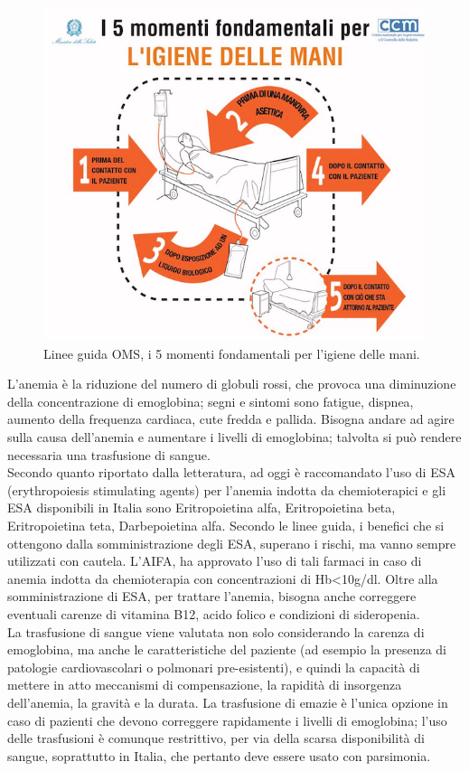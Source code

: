 \begin{figure}[H]
    \begin{center}
    \includegraphics[width=0.5\columnwidth]{img/5MOMENTI.png}
    \vspace{-3mm}
    \end{center}
    \caption{Linee guida OMS, i 5 momenti fondamentali per l'igiene delle mani.
    \cite{MANIOMS}}
    
\end{figure}

L’anemia è la riduzione del numero di globuli rossi, che provoca una diminuzione della concentrazione di emoglobina; 
segni e sintomi sono fatigue, dispnea, aumento della frequenza cardiaca, cute fredda e pallida\cite{LLSLOWCELLS}.
Bisogna andare ad agire sulla causa dell’anemia e aumentare i livelli di emoglobina; talvolta si può rendere necessaria 
una trasfusione di sangue\cite{AMERICANLOWCELLS}.\\
Secondo quanto riportato dalla letteratura, ad oggi è raccomandato l’uso di ESA (erythropoiesis stimulating agents) 
per l’anemia indotta da chemioterapici e gli ESA disponibili in Italia sono Eritropoietina alfa, Eritropoietina beta, 
Eritropoietina teta, Darbepoietina alfa. Secondo le linee guida, i benefici che si ottengono dalla somministrazione 
degli ESA, superano i rischi, ma vanno sempre utilizzati con cautela. L’AIFA, ha approvato l’uso di tali farmaci 
in caso di anemia indotta da chemioterapia con concentrazioni di Hb<10g/dl\cite{AIOMTOSS}.
Oltre alla somministrazione di ESA, per trattare l’anemia, bisogna anche correggere eventuali carenze di vitamina B12, 
acido folico e condizioni di sideropenia.\\ 
La trasfusione di sangue viene valutata non solo considerando la carenza di emoglobina, ma anche le caratteristiche 
del paziente (ad esempio la presenza di patologie cardiovascolari o polmonari pre-esistenti), 
e quindi la capacità di mettere in atto meccanismi di compensazione, la rapidità di 
insorgenza dell’anemia, la gravità e la durata. La trasfusione di emazie è l’unica opzione in caso di pazienti 
che devono correggere rapidamente i livelli di emoglobina; 
l’uso delle trasfusioni è comunque restrittivo, per via della scarsa disponibilità di sangue, 
soprattutto in Italia, che pertanto deve essere usato con parsimonia\cite{AIOMTOSS}.\\

